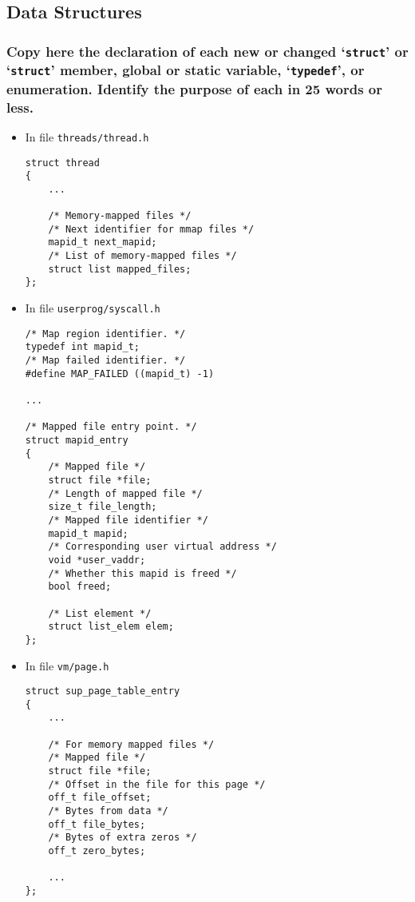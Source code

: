 \documentclass[sigconf, nonacm, balance=false, urlbreakonhyphens=true]{acmart}
\begin{document}
        \label{Memory Mapped Files}

        \subsection{Data Structures}
            
            \subsubsection{Copy here the declaration of each new or changed `\texttt{struct}' or `\texttt{struct}' member, global or static variable, `\texttt{typedef}', or enumeration. Identify the purpose of each in 25 words or less. } 

            \begin{itemize}
                \item In file \texttt{threads/thread.h}
\begin{verbatim}
struct thread
{
    ... 

    /* Memory-mapped files */
    /* Next identifier for mmap files */
    mapid_t next_mapid;
    /* List of memory-mapped files */
    struct list mapped_files;
};
\end{verbatim}
                \item In file \texttt{userprog/syscall.h}
\begin{verbatim}
/* Map region identifier. */
typedef int mapid_t;
/* Map failed identifier. */
#define MAP_FAILED ((mapid_t) -1)

...

/* Mapped file entry point. */
struct mapid_entry
{
    /* Mapped file */
    struct file *file;
    /* Length of mapped file */
    size_t file_length;
    /* Mapped file identifier */
    mapid_t mapid;
    /* Corresponding user virtual address */
    void *user_vaddr;
    /* Whether this mapid is freed */
    bool freed;

    /* List element */
    struct list_elem elem;
};
\end{verbatim}
                \item In file \texttt{vm/page.h}
\begin{verbatim}
struct sup_page_table_entry
{
    ...

    /* For memory mapped files */
    /* Mapped file */
    struct file *file;
    /* Offset in the file for this page */
    off_t file_offset;
    /* Bytes from data */
    off_t file_bytes;
    /* Bytes of extra zeros */
    off_t zero_bytes;

    ...
};
\end{verbatim}
            \end{itemize}
\end{document}
